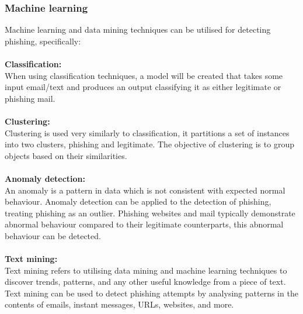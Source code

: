 \documentclass[11pt]{article}
\begin{document}
\subsubsection{Machine learning}
Machine learning and data mining techniques can be utilised for detecting phishing, specifically:\\\\
\large{\textbf{Classification:}}\\
When using classification techniques, a model will be created that takes some input email/text and produces an output classifying it as either legitimate or phishing mail.\\\\
\large{\textbf{Clustering:}}\\
Clustering is used very similarly to classification, it partitions a set of instances into two clusters, phishing and legitimate. The objective of clustering is to group objects based on their similarities.\\\\
\large{\textbf{Anomaly detection:}}\\
An anomaly is a pattern in data which is not consistent with expected normal behaviour.
Anomaly detection can be applied to the detection of phishing, treating phishing as an outlier.
Phishing websites and mail typically demonstrate abnormal behaviour compared to their legitimate counterparts, this abnormal behaviour can be detected.\\\\
\large{\textbf{Text mining:}}\\
Text mining refers to utilising data mining and machine learning techniques to discover trends, patterns, and any other useful knowledge from a piece of text.
Text mining can be used to detect phishing attempts by analysing patterns in the contents of emails, instant messages, URLs, websites, and more.
\end{document}
